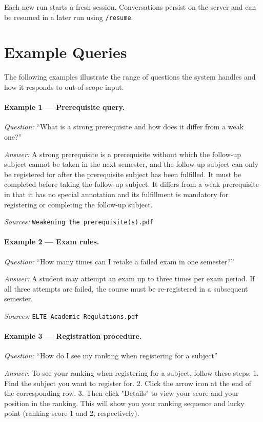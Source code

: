 Each new run starts a fresh session. Conversations persist on the server and
can be resumed in a later run using \texttt{/resume}.

\section{Example Queries}
\label{sec:user-examples}

The following examples illustrate the range of questions the system handles and
how it responds to out-of-scope input.

\paragraph{Example 1 --- Prerequisite query.}
\textit{Question:} ``What is a strong prerequisite and how does it differ from
a weak one?''

\textit{Answer:} A strong prerequisite is a prerequisite without which the follow-up subject 
cannot be taken in the next semester, and the follow-up subject can only be registered for after 
the prerequisite subject has been fulfilled. It must be completed before taking the follow-up subject. 
It differs from a weak prerequisite in that it has no special annotation and its fulfillment is mandatory 
for registering or completing the follow-up subject.

\textit{Sources:} \texttt{Weakening the prerequisite(s).pdf}

\paragraph{Example 2 --- Exam rules.}
\textit{Question:} ``How many times can I retake a failed exam in one
semester?''

\textit{Answer:} A student may attempt an exam up to three times per exam
period. If all three attempts are failed, the course must be re-registered in
a subsequent semester.

\textit{Sources:} \texttt{ELTE Academic Regulations.pdf}

\paragraph{Example 3 --- Registration procedure.}
\textit{Question:} ``How do I see my ranking when registering for a subject''

\textit{Answer:} To see your ranking when registering for a subject, follow these steps: 
1. Find the subject you want to register for. 2. Click the arrow icon at the end of the corresponding row. 
3. Then click "Details" to view your score and your position in the ranking. This will show you your ranking 
sequence and lucky point (ranking score 1 and 2, respectively).

